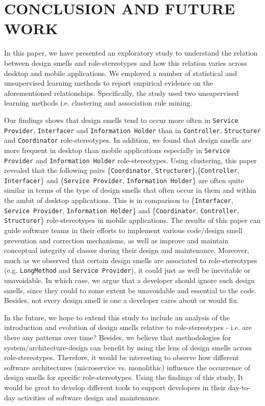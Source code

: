 \documentclass[AMA,Times1COL]{WileyNJDv5} %
\begin{document}
	\section{CONCLUSION AND FUTURE WORK}\label{sec:conclusion}
	
	In this paper, we have presented an exploratory study to understand the relation between design smells and role-stereotypes and how this relation  varies across desktop and mobile applications. We employed a number of statistical and unsupervised learning methods to report empirical evidence on the aforementioned relationships. Specifically, the study used two unsupervised learning methods i.e. clustering and association rule mining.
	
	Our findings shows that design smells tend to occur more often in \texttt{Service Provider}, \texttt{Interfacer} and \texttt{Information Holder} than in \texttt{Controller}, \texttt{Structurer} and \texttt{Coordinator} role-stereotypes. In addition, we found that design smells are more frequent in desktop than mobile applications especially in \texttt{Service Provider} and \texttt{Information Holder} role-stereotypes. Using clustering, this paper revealed that the following pairs \{\texttt{Coordinator}, \texttt{Structurer}\},\{\texttt{Controller}, \texttt{Interfacer}\} and \{\texttt{Service Provider}, \texttt{Information Holder}\} are often quite similar in terms of the type of design smells that often occur in them and within the ambit of desktop applications. This is in  comparison to \{\texttt{Interfacer}, \texttt{Service Provider}, \texttt{Information Holder}\} and \{\texttt{Coordinator}, \texttt{Controller}, \texttt{Structurer}\}  role-stereotypes in mobile applications. The results of this paper can guide software teams in their efforts to implement various code/design smell prevention and correction mechanisms, as well as improve and maintain conceptual integrity of classes during their design and maintenance. Moreover, much as we observed that certain design smells are associated to role-stereotypes (e.g. \texttt{LongMethod} and \texttt{Service Provider}), it could just as well be inevitable or unavoidable. In which case, we argue that a developer should ignore such design smells, since they could to some extent be unavoidable and essential to the code. Besides, not every design smell is one a developer cares about or would fix.
	
	In the future, we hope to extend this study to include an analysis of the introduction and evolution of design smells relative to role-stereotypes - i.e. are there any patterns over time? Besides, we believe that methodologies for system/architecture-design can benefit by using the lens of design smells across role-stereotypes. Therefore, it would be interesting to observe how different software architectures 
	(microservice vs. monolithic) influence the occurrence of design smells for specific role-stereotypes. Using the findings of this study, It would be great to develop different tools to support developers in their day-to-day activities of software design and maintenance.
\end{document}
